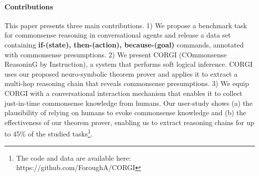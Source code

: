\paragraph{Contributions}
This paper presents three main contributions. 1) We propose a benchmark task for commonsense reasoning in conversational agents and release a data set containing \textbf{if-(state), then-(action), because-(goal)} commands, annotated with commonsense presumptions.
2) We present CORGI (COmmonsense ReasoninG by Instruction), a system that performs soft logical inference. CORGI uses our proposed neuro-symbolic theorem prover and applies it to extract a multi-hop reasoning chain that reveals commonsense presumptions. %
3) We equip CORGI with a conversational interaction mechanism that enables it to collect just-in-time commonsense knowledge from humans.
Our user-study shows (a) the plausibility of relying on humans to evoke commonsense knowledge and (b) the effectiveness of our theorem prover, enabling us to extract reasoning chains for up to 45\% of the studied tasks\footnote{The code and data are available here: https://github.com/ForoughA/CORGI}.




